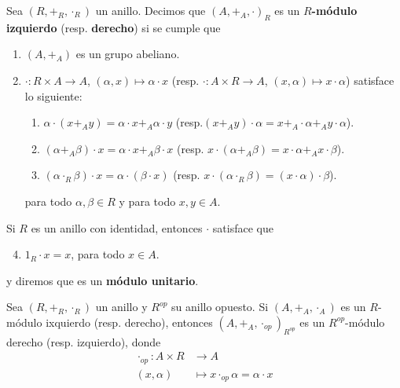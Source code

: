 \documentclass[12pt]{report}
\theoremstyle{largebreak}
\newcommand\cf[3]{\ensuremath{#1:#2\rightarrow#3}}
\begin{document}
    \begin{mydef}
        Sea $(R,+_R,\cdot_R)$ un anillo. Decimos que $(A,+_A,\cdot)_R$ es un \textbf{$R$-módulo izquierdo} (resp. \textbf{derecho}) si se cumple que
        \begin{enumerate}
            \item $(A,+_A)$ es un grupo abeliano.
            \item $\cf{\cdot}{R\times A}{A}$, $(\alpha,x)\mapsto \alpha\cdot x$ (resp. $\cf{\cdot}{A\times R}{A}$, $(x,\alpha)\mapsto x\cdot\alpha$) satisface lo siguiente:
            \begin{enumerate}
                \item $\alpha\cdot(x+_A y)=\alpha\cdot x+_A \alpha\cdot y$ (resp.$(x+_A y)\cdot\alpha=x+_A\cdot\alpha+_A y\cdot\alpha$).
                \item $(\alpha+_A\beta)\cdot x=\alpha\cdot x+_A\beta\cdot x$ (resp. $x\cdot(\alpha+_A\beta)=x\cdot\alpha+_A x\cdot\beta$).
                \item $(\alpha\cdot_R\beta)\cdot x=\alpha\cdot(\beta\cdot x)$ (resp. $x\cdot(\alpha\cdot_R\beta)=(x\cdot\alpha)\cdot\beta$).
            \end{enumerate}
            para todo $\alpha,\beta\in R$ y para todo $x,y\in A$. 
        \end{enumerate}
        Si $R$ es un anillo con identidad, entonces $\cdot$ satisface que
        \renewcommand{\theenumi}{\roman{enumi}}
        \begin{enumerate}
            \setcounter{enumi}{3}
            \item $1_R\cdot x=x$, para todo $x\in A$.
        \end{enumerate}
        y diremos que es un \textbf{módulo unitario}.
    \end{mydef}

    \begin{lema}
        Sea $(R,+_R,\cdot_R)$ un anillo y $R^{op}$ su anillo opuesto. Si $(A,+_A,\cdot_A)$ es un $R$-módulo ixquierdo (resp. derecho), entonces $(A,+_A,\cdot_{op})_{R^{op}}$ es un $R^{op}$-módulo derecho (resp. izquierdo), donde
        \begin{equation*}
            \begin{split}
                \cdot_{op}:A\times R&\rightarrow A\\
                (x,\alpha)&\mapsto x\cdot_{op}\alpha=\alpha\cdot x 
            \end{split}
        \end{equation*}
    \end{lema}
\end{document}
